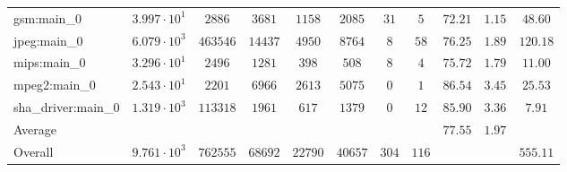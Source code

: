 \begin{tabular}{|l|c|c|c|c|c|c|c|c|c|c|}
gsm:main\_0             & $ 3.997 \cdot 10^{1} $ & $ 2886   $ & $ 3681  $ & $ 1158  $ & $ 2085  $ & $ 31  $ & $ 5   $ & $ 72.21       $ & $ 1.15    $ & $ 48.60   $ \\
jpeg:main\_0            & $ 6.079 \cdot 10^{3} $ & $ 463546 $ & $ 14437 $ & $ 4950  $ & $ 8764  $ & $ 8   $ & $ 58  $ & $ 76.25       $ & $ 1.89    $ & $ 120.18  $ \\
mips:main\_0            & $ 3.296 \cdot 10^{1} $ & $ 2496   $ & $ 1281  $ & $ 398   $ & $ 508   $ & $ 8   $ & $ 4   $ & $ 75.72       $ & $ 1.79    $ & $ 11.00   $ \\
mpeg2:main\_0           & $ 2.543 \cdot 10^{1} $ & $ 2201   $ & $ 6966  $ & $ 2613  $ & $ 5075  $ & $ 0   $ & $ 1   $ & $ 86.54       $ & $ 3.45    $ & $ 25.53   $ \\
sha\_driver:main\_0     & $ 1.319 \cdot 10^{3} $ & $ 113318 $ & $ 1961  $ & $ 617   $ & $ 1379  $ & $ 0   $ & $ 12  $ & $ 85.90       $ & $ 3.36    $ & $ 7.91    $ \\
\hline
Average                 & $                    $ & $        $ & $       $ & $       $ & $       $ & $     $ & $     $ & $ 77.55       $ & $ 1.97    $ & $         $ \\
\hline
Overall                 & $ 9.761 \cdot 10^{3} $ & $ 762555 $ & $ 68692 $ & $ 22790 $ & $ 40657 $ & $ 304 $ & $ 116 $ & $             $ & $         $ & $ 555.11  $ \\
\hline
\end{tabular}

